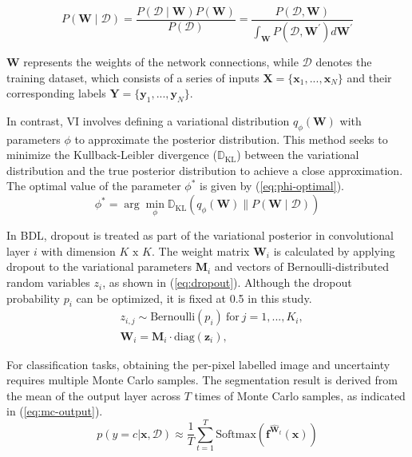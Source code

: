 \begin{equation}
    P(\mathbf{W}\mid \mathcal{D})=\frac{P(\mathcal{D}\mid \mathbf{W})P(\mathbf{W})}{P(\mathcal{D})}=\frac{P(\mathcal{D},\mathbf{W})}{\int_{\mathbf{W}} P(\mathcal{D},\mathbf{W}^{\prime})d\mathbf{W}^{\prime}}
    \label{eq:bayes-paradigm}
\end{equation}
\vspace{2mm}

$\mathbf{W}$ represents the weights of the network connections, while $\mathcal{D}$ denotes the training dataset, 
which consists of a series of inputs $\mathbf{X}=\{\mathbf{x}_{1},...,\mathbf{x}_{N}\}$ and their corresponding 
labels $\mathbf{Y}=\{\mathbf{y}_{1},...,\mathbf{y}_{N}\}$.

In contrast, VI involves defining a variational distribution $q_{\phi}(\mathbf{W})$ with parameters $\phi$ to 
approximate the posterior distribution. This method seeks to minimize the Kullback-Leibler divergence ($\mathbb{D}_{\text{KL}}$)
\cite{kldivergence} between the variational distribution and the true posterior distribution to achieve a close 
approximation. The optimal value of the parameter $\phi^*$ is given by (\ref{eq:phi-optimal}).\\
\begin{equation}
    \phi^* = \arg \min_{\phi} \mathbb{D}_{\text{KL}}(q_{\phi}(\mathbf{W}) \parallel P(\mathbf{W}\mid \mathcal{D}))
    \label{eq:phi-optimal}
\end{equation}

In BDL, dropout is treated as part of the variational posterior in convolutional layer $i$ with dimension 
$K\text{ x }K$. The weight matrix $\mathbf{W}_i$ is calculated by applying dropout to the variational parameters 
$\mathbf{M}_i$ and vectors of Bernoulli-distributed random variables $z_i$, as shown in (\ref{eq:dropout}). Although 
the dropout probability $p_i$ can be optimized, it is fixed at 0.5 in this study. \\
\vspace{1mm}
\begin{equation}
\begin{aligned}
    &z_{i,j}\sim\mathrm{Bernoulli}(p_i)\mathrm{~for~}j=1,...,K_i,\\
    &\mathbf{W}_i=\mathbf{M}_i\cdot\mathrm{diag}(\mathbf{z}_i),
    \label{eq:dropout}
\end{aligned}
\end{equation}
\vspace{2mm}

For classification tasks, obtaining the per-pixel labelled image and uncertainty requires multiple Monte Carlo 
samples. The segmentation result is derived from the mean of the output layer across $T$ times of Monte Carlo samples, 
as indicated in (\ref{eq:mc-output}). \\
\vspace{1mm}
\begin{equation}
    p(y=c|\mathbf{x},\mathcal{D})\approx\frac{1}{T}\sum_{t=1}^{T}\mathrm{Softmax}(\mathbf{f}^{\widehat{\mathbf{W}}_{t}}(\mathbf{x}))
    \label{eq:mc-output}
\end{equation}
\vspace{2mm}

